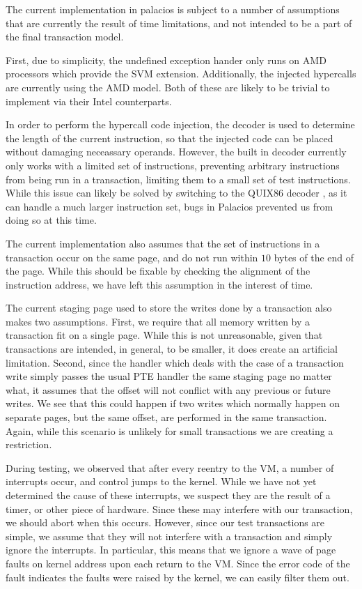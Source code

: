 \documentclass{acm_proc_article-sp}
\begin{document}
The current implementation in palacios is subject to a number of assumptions
that are currently the result of time limitations, and not intended to be a
part of the final transaction model.

First, due to simplicity, the undefined exception hander only runs on AMD 
processors which provide the SVM extension. Additionally, the injected 
hypercalls are currently using the AMD model. Both of these are likely to be
trivial to implement via their Intel counterparts.  

In order to perform the hypercall code injection, the decoder is used to 
determine the length of the current instruction, so that the injected code
can be placed without damaging neceassary operands. However, the built in
decoder currently only works with a limited set of instructions, preventing
arbitrary instructions from being run in a transaction, limiting them to a 
small set of test instructions. While this issue can likely be solved by 
switching to the QUIX86 decoder \cite{quix86site}, as it can handle a much larger
instruction set, bugs in Palacios prevented us from doing so at this time.

The current implementation also assumes that the set of instructions in a 
transaction occur on the same page, and do not run within $10$ bytes of the
end of the page. While this should be fixable by checking the alignment of
the instruction address, we have left this assumption in the interest of 
time. 

The current staging page used to store the writes done by a transaction also
makes two assumptions. First, we require that all memory written by a 
transaction fit on a single page. While this is not unreasonable, given that
transactions are intended, in general, to be smaller, it does create an
artificial limitation. Second, since the handler which deals with the case
of a transaction write simply passes the usual PTE handler the same staging
page no matter what, it assumes that the offset will not conflict with any
previous or future writes. We see that this could happen if two writes which
normally happen on separate pages, but the same offset, are performed in the
same transaction. Again, while this scenario is unlikely for small transactions
we are creating a restriction.
 
During testing, we observed that after every reentry to the VM, a number
of interrupts occur, and control jumps to the kernel. While we have not yet
determined the cause of these interrupts, we suspect they are the result of 
a timer, or other piece of hardware. Since these may interfere with our 
transaction, we should abort when this occurs. However, since our test 
transactions are simple, we assume that they will not interfere with a 
transaction and simply ignore the interrupts. In particular, this means that
we ignore a wave of page faults on kernel address upon each return to the
VM. Since the error code of the fault indicates the faults were raised by
the kernel, we can easily filter them out.   
\end{document}
